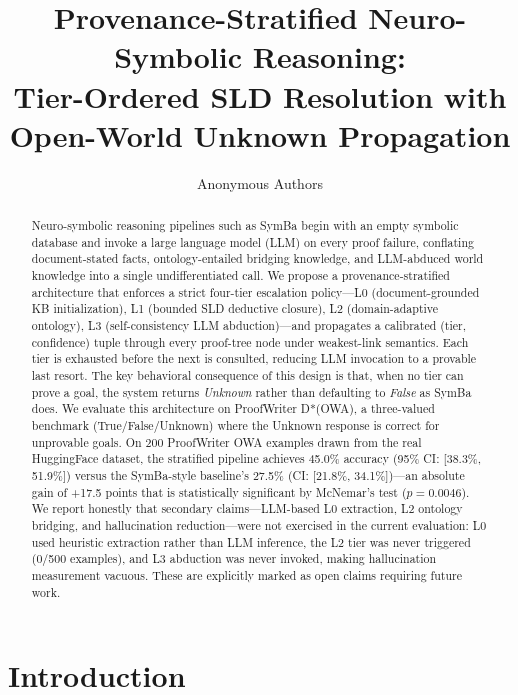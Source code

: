 \documentclass[11pt,letterpaper]{article}
\title{\textbf{Provenance-Stratified Neuro-Symbolic Reasoning: \\
Tier-Ordered SLD Resolution with Open-World Unknown Propagation}}
\author{Anonymous Authors}
\date{}
\begin{document}
\maketitle

\begin{abstract}
Neuro-symbolic reasoning pipelines such as SymBa begin with an empty symbolic database and invoke a large language model
(LLM) on every proof failure, conflating document-stated facts, ontology-entailed bridging knowledge, and LLM-abduced world
knowledge into a single undifferentiated call. We propose a provenance-stratified architecture that enforces a strict four-tier
escalation policy---L0 (document-grounded KB initialization), L1 (bounded SLD deductive closure), L2 (domain-adaptive ontology),
L3 (self-consistency LLM abduction)---and propagates a calibrated (tier, confidence) tuple through every proof-tree node under
weakest-link semantics. Each tier is exhausted before the next is consulted, reducing LLM invocation to a provable last
resort. The key behavioral consequence of this design is that, when no tier can prove a goal, the system returns \emph{Unknown}
rather than defaulting to \emph{False} as SymBa does. We evaluate this architecture on ProofWriter D*(OWA), a three-valued benchmark
(True/False/Unknown) where the Unknown response is correct for unprovable goals. On 200 ProofWriter OWA examples drawn from
the real HuggingFace dataset, the stratified pipeline achieves 45.0\% accuracy (95\% CI: [38.3\%, 51.9\%]) versus the SymBa-style
baseline's 27.5\% (CI: [21.8\%, 34.1\%])---an absolute gain of +17.5 points that is statistically significant by McNemar's test
($p = 0.0046$). We report honestly that secondary claims---LLM-based L0 extraction, L2 ontology bridging, and hallucination
reduction---were not exercised in the current evaluation: L0 used heuristic extraction rather than LLM inference, the L2 tier
was never triggered (0/500 examples), and L3 abduction was never invoked, making hallucination measurement vacuous. These
are explicitly marked as open claims requiring future work.
\end{abstract}

\section{Introduction}
\end{document}
